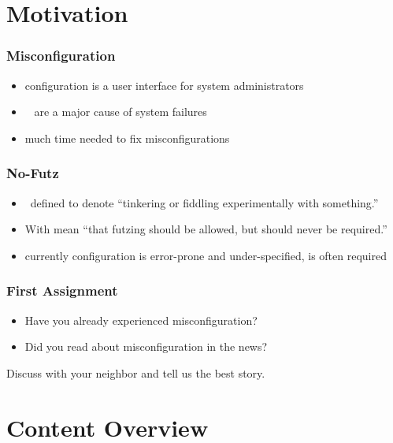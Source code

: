 \documentclass{beamer}
\begin{document}
\section{Motivation}
{
%
\begin{frame}
	\frametitle{Misconfiguration}
	\begin{itemize}
		\item configuration is a user interface for system administrators
		\item {}~\cite{yin2011empirical,su2007autobash,attariyan2010automating,xu2015systems}
			are a major cause of system failures~\cite{wool2004quantitative,oppenheimer2003internet,pertet2005causes}
		\item much time needed to fix misconfigurations~\cite{rabkin2011static,oppenheimer2003internet,yin2011empirical,mahajan2002bgp}
	\end{itemize}
\end{frame}
\begin{frame}
	\frametitle{No-Futz}
	\begin{itemize}
		\item \citet{holland2001nofutz}~defined  to denote \enquote{tinkering or fiddling experimentally with something.}
		\item With  \citet{holland2001nofutz} mean \enquote{that futzing should be allowed, but should never be required.}
		\item currently configuration is error-prone and under-specified,  is often required
	\end{itemize}
\end{frame}
}
\begin{assignment}
	\frametitle{First Assignment}
	\begin{itemize}
		\item Have you already experienced misconfiguration?
		\item Did you read about misconfiguration in the news?
	\end{itemize}
	\begin{task}
	Discuss with your neighbor and tell us the best story.
	\end{task}
\end{assignment}

\section{Content Overview}
\end{document}
